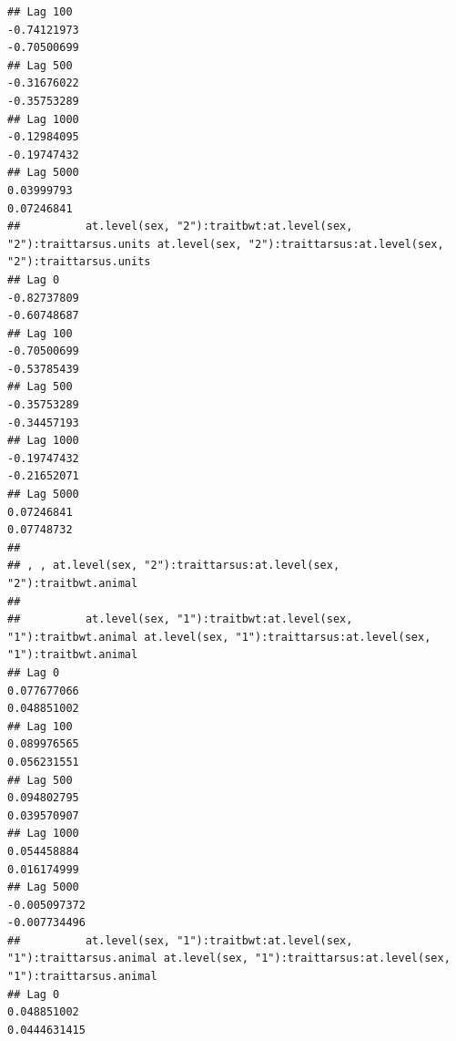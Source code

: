\documentclass[
  12pt,
]{book}
\begin{document}
\begin{verbatim}
## Lag 100                                                    -0.74121973                                                      -0.70500699
## Lag 500                                                    -0.31676022                                                      -0.35753289
## Lag 1000                                                   -0.12984095                                                      -0.19747432
## Lag 5000                                                    0.03999793                                                       0.07246841
##          at.level(sex, "2"):traitbwt:at.level(sex, "2"):traittarsus.units at.level(sex, "2"):traittarsus:at.level(sex, "2"):traittarsus.units
## Lag 0                                                         -0.82737809                                                         -0.60748687
## Lag 100                                                       -0.70500699                                                         -0.53785439
## Lag 500                                                       -0.35753289                                                         -0.34457193
## Lag 1000                                                      -0.19747432                                                         -0.21652071
## Lag 5000                                                       0.07246841                                                          0.07748732
## 
## , , at.level(sex, "2"):traittarsus:at.level(sex, "2"):traitbwt.animal
## 
##          at.level(sex, "1"):traitbwt:at.level(sex, "1"):traitbwt.animal at.level(sex, "1"):traittarsus:at.level(sex, "1"):traitbwt.animal
## Lag 0                                                       0.077677066                                                       0.048851002
## Lag 100                                                     0.089976565                                                       0.056231551
## Lag 500                                                     0.094802795                                                       0.039570907
## Lag 1000                                                    0.054458884                                                       0.016174999
## Lag 5000                                                   -0.005097372                                                      -0.007734496
##          at.level(sex, "1"):traitbwt:at.level(sex, "1"):traittarsus.animal at.level(sex, "1"):traittarsus:at.level(sex, "1"):traittarsus.animal
## Lag 0                                                          0.048851002                                                         0.0444631415

\end{verbatim}
\end{document}
